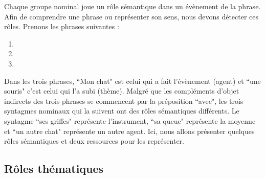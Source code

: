 \documentclass{KodeBook}
\begin{document}
Chaque groupe nominal joue un rôle sémantique dans un évènement de la phrase. 
Afin de comprendre une phrase ou représenter son sens, nous devons détecter ces rôles.
Prenons les phrases suivantes :
\begin{enumerate}
	\item {} 
	\item {}
	\item {}
\end{enumerate}
Dans les trois phrases, ``Mon chat" est celui qui a fait l'évènement (agent) et ``une souris" c'est celui qui l'a subi (thème).
Malgré que les compléments d'objet indirects des trois phrases se commencent par la préposition ``avec", les trois syntagmes nominaux qui la suivent ont des rôles sémantiques différents. 
Le syntagme ``ses griffes" représente l'instrument, ``sa queue" représente la moyenne et ``un autre chat" représente un autre agent.
Ici, nous allons présenter quelques rôles sémantiques et deux ressources pour les représenter.

\subsection{Rôles thématiques}
\end{document}
